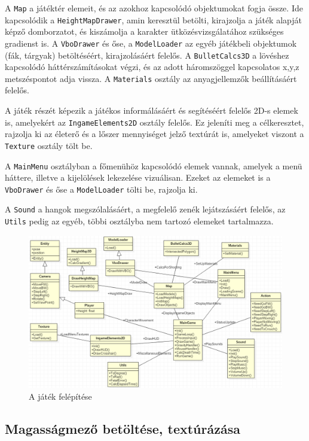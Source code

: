 A \texttt{Map} a játéktér elemeit, és az azokhoz kapcsolódó objektumokat fogja össze. Ide kapcsolódik a \texttt{HeightMapDrawer}, amin keresztül betölti, kirajzolja a játék alapját képző domborzatot, és kiszámolja a karakter ütközésvizsgálatához szükséges gradienst is. A \texttt{VboDrawer} és őse, a \texttt{ModelLoader} az egyéb játékbeli objektumok (fák, tárgyak) betöltéséért, kirajzolásáért felelős. A \texttt{BulletCalcs3D} a lövéshez kapcsolódó háttérszámításokat végzi, és az adott háromszöggel kapcsolatos x,y,z metszéspontot adja vissza. A \texttt{Materials} osztály az anyagjellemzők beállításáért felelős.

A játék részét képezik a játékos informálásáért és segítéséért felelős 2D-s elemek is, amelyekért az \texttt{IngameElements2D} osztály felelős. Ez jeleníti meg a célkeresztet, rajzolja ki az életerő és a lőszer mennyiséget jelző textúrát is, amelyeket viszont a \texttt{Texture} osztály tölt be.

A \texttt{MainMenu} osztályban a főmenühöz kapcsolódó elemek vannak, amelyek a menü háttere, illetve a kijelölések lekezelése vizuálisan. Ezeket az elemeket is a \texttt{VboDrawer} és őse a \texttt{ModelLoader} tölti be, rajzolja ki.

A \texttt{Sound} a hangok megszólalásáért, a megfelelő zenék lejátszásáért felelős, az \texttt{Utils} pedig az egyéb, többi osztályba nem tartozó elemeket tartalmazza.

\begin{figure}[h]
\centering
\includegraphics[scale=0.5]{kepek/uml.png}
\caption{A játék felépítése}
\label{fig:uml}
\end{figure}

\subsection{Magasságmező betöltése, textúrázása}

